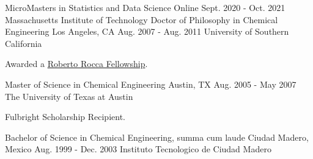 

\begin{cventries}

  \cventry
    {MicroMasters in Statistics and Data Science} %
    {Online} %
    {Sept. 2020 - Oct. 2021} %
    {Massachusetts Institute of Technology} %
    {}%
\cventry
    {Doctor of Philosophy in Chemical Engineering} %
    {Los Angeles, CA} %
    {Aug. 2007 - Aug. 2011} %
    {University of Southern California} %
    {
      \begin{cvitems} %
        \item  Awarded a {\href{http://www.robertorocca.org/en/fellowships/fellows07.aspx}{Roberto Rocca Fellowship}}.
      \end{cvitems}
    }%
  \cventry
      {Master of Science in Chemical Engineering} %
      {Austin, TX} %
      {Aug. 2005 - May 2007} %
      {The University of Texas at Austin} %
      {
        \begin{cvitems} %
          \item Fulbright Scholarship Recipient.
        \end{cvitems}
      }%
  \cventry
      {Bachelor of Science in Chemical Engineering, summa cum laude} %
      {Ciudad Madero, Mexico} %
      {Aug. 1999 - Dec. 2003} %
      {Instituto Tecnologico de Ciudad Madero} %
      {}
\end{cventries}
